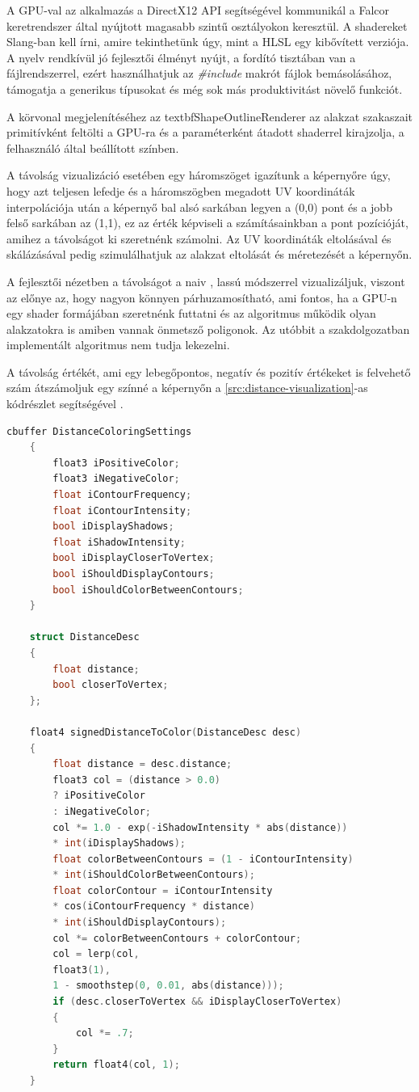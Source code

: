 A GPU-val az alkalmazás a DirectX12 API segítségével kommunikál a Falcor keretrendszer \cite{falcor} által nyújtott magasabb szintű osztályokon keresztül. A shadereket Slang-ban \cite{slang} kell írni, amire tekinthetünk úgy, mint a HLSL egy kibővített verziója. A nyelv rendkívül jó fejlesztői élményt nyújt, a fordító tisztában van a fájlrendszerrel, ezért használhatjuk az \textit{\#include} makrót fájlok bemásolásához, támogatja a generikus típusokat és még sok más produktivitást növelő funkciót.

A körvonal megjelenítéséhez az textbf{ShapeOutlineRenderer} az alakzat szakaszait primitívként feltölti a GPU-ra és a paraméterként átadott shaderrel kirajzolja, a felhasználó által beállított színben.

A távolság vizualizáció esetében egy háromszöget igazítunk a képernyőre úgy, hogy azt teljesen lefedje és a háromszögben megadott UV koordináták interpolációja után a képernyő bal alsó sarkában legyen a (0,0) pont és a jobb felső sarkában az (1,1), ez az érték képviseli a számításainkban a pont pozícióját, amihez a távolságot ki szeretnénk számolni. Az UV koordináták eltolásával és skálázásával pedig szimulálhatjuk az alakzat eltolását és méretezését a képernyőn.

A fejlesztői nézetben a távolságot a naiv \cite{inigoquilez2d}, lassú módszerrel vizualizáljuk, viszont az előnye az, hogy nagyon könnyen párhuzamosítható, ami fontos, ha a GPU-n egy shader formájában szeretnénk futtatni és az algoritmus működik olyan alakzatokra is amiben vannak önmetsző poligonok. Az utóbbit a szakdolgozatban implementált algoritmus nem tudja lekezelni.

A távolság értékét, ami egy lebegőpontos, negatív és pozitív értékeket is felvehető szám átszámoljuk egy színné a képernyőn a \ref{src:distance-visualization}-as kódrészlet segítségével \cite{inigoquilezshader}.

\begin{lstlisting}[language=c]
	cbuffer DistanceColoringSettings
	{
		float3 iPositiveColor;
		float3 iNegativeColor;
		float iContourFrequency;
		float iContourIntensity;
		bool iDisplayShadows;
		float iShadowIntensity;
		bool iDisplayCloserToVertex;
		bool iShouldDisplayContours;
		bool iShouldColorBetweenContours;
	}
	
	struct DistanceDesc
	{
		float distance;
		bool closerToVertex;
	};
	
	float4 signedDistanceToColor(DistanceDesc desc)
	{
		float distance = desc.distance;
		float3 col = (distance > 0.0)
		? iPositiveColor
		: iNegativeColor;
		col *= 1.0 - exp(-iShadowIntensity * abs(distance))
		* int(iDisplayShadows);
		float colorBetweenContours = (1 - iContourIntensity)
		* int(iShouldColorBetweenContours);
		float colorContour = iContourIntensity
		* cos(iContourFrequency * distance)
		* int(iShouldDisplayContours);
		col *= colorBetweenContours + colorContour;
		col = lerp(col,
		float3(1),
		1 - smoothstep(0, 0.01, abs(distance)));
		if (desc.closerToVertex && iDisplayCloserToVertex)
		{
			col *= .7;
		}
		return float4(col, 1);
	}
	
\end{lstlisting}

